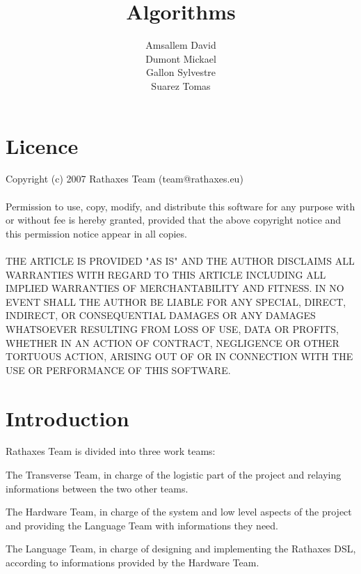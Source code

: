 \documentclass[11pt]{report}
\begin{document}
\author{Amsallem David\\Dumont Mickael\\Gallon Sylvestre\\Suarez Tomas}
\title{Algorithms}
\maketitle

\section*{Licence}
Copyright (c) 2007 Rathaxes Team (team@rathaxes.eu)
\\\\
Permission to use, copy, modify, and distribute this software for any
purpose with or without fee is hereby granted, provided that the above
copyright notice and this permission notice appear in all copies.
\\\\
THE ARTICLE IS PROVIDED "AS IS" AND THE AUTHOR DISCLAIMS ALL WARRANTIES
WITH REGARD TO THIS ARTICLE INCLUDING ALL IMPLIED WARRANTIES OF
MERCHANTABILITY AND FITNESS. IN NO EVENT SHALL THE AUTHOR BE LIABLE FOR
ANY SPECIAL, DIRECT, INDIRECT, OR CONSEQUENTIAL DAMAGES OR ANY DAMAGES
WHATSOEVER RESULTING FROM LOSS OF USE, DATA OR PROFITS, WHETHER IN AN
ACTION OF CONTRACT, NEGLIGENCE OR OTHER TORTUOUS ACTION, ARISING OUT OF
OR IN CONNECTION WITH THE USE OR PERFORMANCE OF THIS SOFTWARE.
\newpage

\section*{Introduction}

Rathaxes Team is divided into three work teams:\\
\begin{description}
  \item{The Transverse Team, in charge of the logistic part of the project and
    relaying informations between the two other teams.}
  \item{The Hardware Team, in charge of the system and low level aspects of the
    project and providing the Language Team with informations they need.}
  \item{The Language Team, in charge of designing and implementing the Rathaxes
    DSL, according to informations provided by the Hardware Team.\\}
\end{description}
\end{document}
